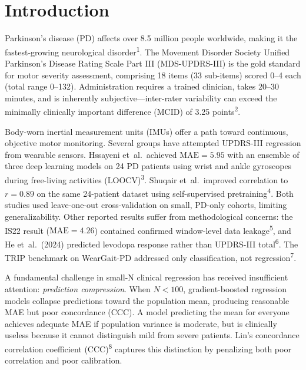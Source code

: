\documentclass[11pt,a4paper]{article}
\begin{document}
\section{Introduction}

Parkinson's disease (PD) affects over 8.5 million people worldwide, making it the fastest-growing neurological disorder\textsuperscript{1}. The Movement Disorder Society Unified Parkinson's Disease Rating Scale Part III (MDS-UPDRS-III) is the gold standard for motor severity assessment, comprising 18 items (33 sub-items) scored 0--4 each (total range 0--132). Administration requires a trained clinician, takes 20--30 minutes, and is inherently subjective---inter-rater variability can exceed the minimally clinically important difference (MCID) of 3.25 points\textsuperscript{2}.

Body-worn inertial measurement units (IMUs) offer a path toward continuous, objective motor monitoring. Several groups have attempted UPDRS-III regression from wearable sensors. Hssayeni et~al.\ achieved $\mathrm{MAE}=5.95$ with an ensemble of three deep learning models on 24 PD patients using wrist and ankle gyroscopes during free-living activities (LOOCV)\textsuperscript{3}. Shuqair et~al.\ improved correlation to $r=0.89$ on the same 24-patient dataset using self-supervised pretraining\textsuperscript{4}. Both studies used leave-one-out cross-validation on small, PD-only cohorts, limiting generalizability. Other reported results suffer from methodological concerns: the IS22 result ($\mathrm{MAE}=4.26$) contained confirmed window-level data leakage\textsuperscript{5}, and He et~al.\ (2024) predicted levodopa response rather than UPDRS-III total\textsuperscript{6}. The TRIP benchmark on WearGait-PD addressed only classification, not regression\textsuperscript{7}.

A fundamental challenge in small-N clinical regression has received insufficient attention: \emph{prediction compression}. When $N<100$, gradient-boosted regression models collapse predictions toward the population mean, producing reasonable MAE but poor concordance (CCC). A model predicting the mean for everyone achieves adequate MAE if population variance is moderate, but is clinically useless because it cannot distinguish mild from severe patients. Lin's concordance correlation coefficient (CCC)\textsuperscript{8} captures this distinction by penalizing both poor correlation and poor calibration.
\end{document}

